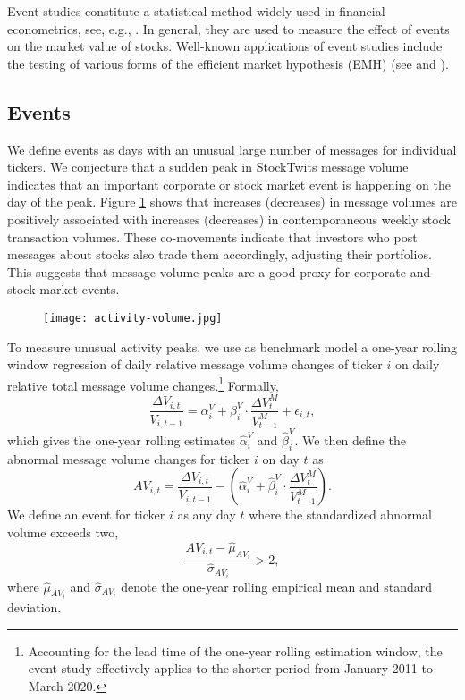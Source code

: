 Event studies constitute a statistical method widely used in financial econometrics, see, e.g., \citet{mackinlay1997event}. In general, they are used to measure the effect of events on the market value of stocks. Well-known applications of event studies include the testing of various forms of the efficient market hypothesis (EMH) (see \citet{fama1969} and \citet{fama1991efficient}). 


\subsection{Events}
We define events as days with an unusual large number of messages for individual tickers. We conjecture that a sudden peak in StockTwits message volume indicates that an important corporate or stock market event is happening on the day of the peak. Figure \ref{fig:actvol} shows that increases (decreases) in message volumes are positively associated with increases (decreases) in contemporaneous weekly stock transaction volumes. These co-movements indicate that investors who post messages about stocks also trade them accordingly, adjusting their portfolios. This suggests that message volume peaks are a good proxy for corporate and stock market events.


\begin{figure}[h]
    \centering
    \texttt{[image: activity-volume.jpg]}
    \label{fig:actvol}
\end{figure}

To measure unusual activity peaks, we use as benchmark model a one-year rolling window regression of daily relative message volume changes of ticker $i$ on daily relative total message volume changes.\footnote{Accounting for the lead time of the one-year rolling estimation window, the event study effectively applies to the shorter period from January 2011 to March 2020.} Formally,
\begin{equation}
\dfrac{\Delta V_{i,t}}{V_{i,t-1}} = \alpha_i^V + \beta_i^V \cdot \dfrac{\Delta V_t^M}{V_{t-1}^M} + \epsilon_{i,t},    
\end{equation} 
which gives the one-year rolling estimates $\hat{\alpha}_i^V$ and $\hat{\beta}_i^V$. We then define the abnormal message volume changes for ticker $i$ on day $t$ as 
\begin{equation}
    AV_{i,t} = \dfrac{\Delta V_{i,t}}{V_{i,t-1}} - \left(\hat{\alpha}_i^V + \hat{\beta}_i^V \cdot \dfrac{\Delta V_t^M}{V_{t-1}^M}\right).
\end{equation}
We define an event for ticker $i$ as any day $t$ where the standardized abnormal volume exceeds two, 
\begin{equation}
    \dfrac{AV_{i,t} - \hat{\mu}_{AV_i}}{\hat{\sigma}_{AV_i}} > 2,
\end{equation}
where $\hat{\mu}_{AV_i}$ and $\hat{\sigma}_{AV_i}$ denote the one-year rolling empirical mean and standard deviation. 



